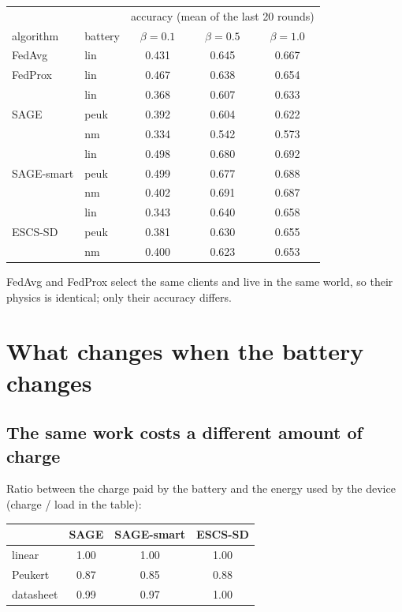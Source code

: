 \documentclass[11pt,a4paper]{article}
\begin{document}
\begin{center}
\begin{tabular}{llccc}
\toprule
 & & \multicolumn{3}{c}{accuracy (mean of the last 20 rounds)} \\
algorithm & battery & $\beta=0.1$ & $\beta=0.5$ & $\beta=1.0$ \\
\midrule
FedAvg                      & lin  & 0.431 & 0.645 & 0.667 \\
FedProx                     & lin  & 0.467 & 0.638 & 0.654 \\
\midrule
\multirow{3}{*}{SAGE}       & lin  & 0.368 & 0.607 & 0.633 \\
                            & peuk & 0.392 & 0.604 & 0.622 \\
                            & nm   & 0.334 & 0.542 & 0.573 \\
\midrule
\multirow{3}{*}{SAGE-smart} & lin  & 0.498 & 0.680 & 0.692 \\
                            & peuk & 0.499 & 0.677 & 0.688 \\
                            & nm   & 0.402 & 0.691 & 0.687 \\
\midrule
\multirow{3}{*}{ESCS-SD}    & lin  & 0.343 & 0.640 & 0.658 \\
                            & peuk & 0.381 & 0.630 & 0.655 \\
                            & nm   & 0.400 & 0.623 & 0.653 \\
\bottomrule
\end{tabular}
\end{center}

FedAvg and FedProx select the same clients and live in the same world, so
their physics is identical; only their accuracy differs.

\section{What changes when the battery changes}

\subsection{The same work costs a different amount of charge}

Ratio between the charge paid by the battery and the energy used by the device
(charge / load in the table):

\begin{center}
\begin{tabular}{lccc}
\toprule
 & SAGE & SAGE-smart & ESCS-SD \\
\midrule
linear    & 1.00 & 1.00 & 1.00 \\
Peukert   & 0.87 & 0.85 & 0.88 \\
datasheet & 0.99 & 0.97 & 1.00 \\
\bottomrule
\end{tabular}
\end{center}
\end{document}
